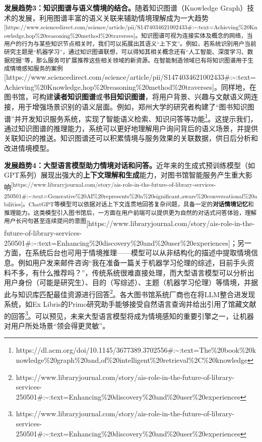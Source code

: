 \documentclass[
  letterpaper,
]{scrbook}
\begin{document}
\textbf{发展趋势3：知识图谱与语义情境的结合。}随着知识图谱（Knowledge
Graph）技术的发展，利用图谱丰富的语义关联来辅助情境理解成为一大趋势\textsuperscript{{[}https://www.sciencedirect.com/science/article/pii/S1474034621002433\#:\textasciitilde:text=Achieving\%20Knowledge,hop\%20reasoning\%20method\%20traverses{]}。知识图谱可视为连接实体及概念的网络，当用户的行为与某些知识节点相关时，我们可以拓展出其语义``上下文''。例如，若系统识别用户当前研究主题是``机器学习''，通过知识图谱联想，可以得知其相关概念还有``人工智能、深度学习、数据挖掘''等，那么服务可扩展推荐这些相关领域的新资源。在智能制造领域已有将知识图谱用于生成情境感知服务的案例}{[}https://www.sciencedirect.com/science/article/pii/S1474034621002433\#:\textasciitilde:text=Achieving\%20Knowledge,hop\%20reasoning\%20method\%20traverses{]}。同样地，在图书馆，可构建\textbf{读者知识图谱}或\textbf{书目知识图谱}，将用户背景、兴趣与文献语义网连接，用于增强场景识别的语义层面。例如，郑州大学的研究者构建了``图书知识图谱''并开发知识服务系统，实现了智能语义检索、知识问答等功能\footnote{https://dl.acm.org/doi/10.1145/3677389.3702556\#:\textasciitilde:text=The\%20book\%20knowledge\%20graph\%20and,of\%20intelligent\%20retrieval\%2C\%20knowledge}。这提示我们，通过知识图谱的推理能力，系统可以更好地理解用户询问背后的语义场景，并提供关联知识的推送。知识图谱还可以积累情境与服务效果的关联数据，供日后分析和改进情境模型。

\textbf{发展趋势4：大型语言模型助力情境对话和问答。}近年来的生成式预训练模型（如GPT系列）展现出强大的\textbf{上下文理解和生成}能力，对图书馆智能服务产生重大影响\textsuperscript{{[}https://www.libraryjournal.com/story/ais-role-in-the-future-of-library-services-250501\#:\textasciitilde:text=Generative\%20AI\%20represents\%20a\%20significant,aware\%20conversational\%20abilities{]}。ChatGPT等模型可以依据对话上下文连贯地回答复杂问题，具备一定的\textbf{对话情境记忆}和推理能力。这类模型引入图书馆后，一方面在用户前端可以提供更为自然的对话式问答体验，理解用户长问句甚至连续提问的意图}{[}https://www.libraryjournal.com/story/ais-role-in-the-future-of-library-services-250501\#:\textasciitilde:text=Enhancing\%20discovery\%20and\%20user\%20experiences{]}；另一方面，在系统后台也可用于情境推理------模型可以从非结构化的描述中提取情境信息。例如用户发来邮件咨询``我在准备一篇关于机器学习伦理的综述，目前手头资料不多，有什么推荐吗？''，传统系统很难直接处理，而大型语言模型可以分析出用户身份（可能是研究生）、目的（写综述）、主题（机器学习伦理）等情境，并据此与知识库匹配最佳资源进行回答\footnote{https://www.libraryjournal.com/story/ais-role-in-the-future-of-library-services-250501\#:\textasciitilde:text=Enhancing\%20discovery\%20and\%20user\%20experiences}。各大图书馆系统厂商也在将LLM整合进发现系统，如Ex
Libris的Primo研究助手能够接受自然语言查询并给出引用了馆藏文献的回答\footnote{https://www.libraryjournal.com/story/ais-role-in-the-future-of-library-services-250501\#:\textasciitilde:text=Enhancing\%20discovery\%20and\%20user\%20experiences}。可以预见，未来大型语言模型将成为情境感知的重要引擎之一，让机器对用户所处场景``领会得更灵敏''。
\end{document}
